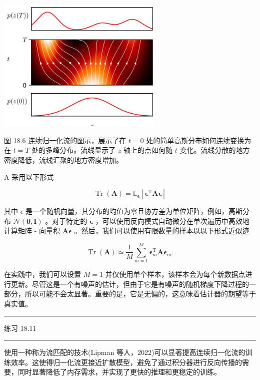 \documentclass[10pt]{report}
\newcommand{\HRule}{\begin{center}\rule{0.9\linewidth}{0.2mm}\end{center}}
\begin{document}
\begin{center}
\includegraphics[max width=0.6\textwidth]{images/0194e279-9b28-703a-88f4-c3ac21e2010d_577_786_342_770_622_0.jpg}
\end{center}
\hspace*{3em} 

图 18.6 连续归一化流的图示，展示了在 \(t = 0\) 处的简单高斯分布如何连续变换为在 \(t = T\) 处的多峰分布。流线显示了 \(z\) 轴上的点如何随 \(t\) 变化。流线分散的地方密度降低，流线汇聚的地方密度增加。

A 采用以下形式

\[
\operatorname{Tr}\left( \mathbf{A}\right)  = {\mathbb{E}}_{\mathbf{\epsilon }}\left\lbrack  {{\mathbf{\epsilon }}^{\mathrm{T}}\mathbf{A}\mathbf{\epsilon }}\right\rbrack   \tag{18.29}
\]

其中 \(\epsilon\) 是一个随机向量，其分布的均值为零且协方差为单位矩阵，例如，高斯分布 \(\mathcal{N}\left( {\mathbf{0},\mathbf{I}}\right)\) 。对于特定的 \(\mathbf{\epsilon }\) ，可以使用反向模式自动微分在单次遍历中高效地计算矩阵 - 向量积 \(\mathbf{A}\mathbf{\epsilon }\) 。然后，我们可以使用有限数量的样本以以下形式近似迹

\[
\operatorname{Tr}\left( \mathbf{A}\right)  \simeq  \frac{1}{M}\mathop{\sum }\limits_{{m = 1}}^{M}{\mathbf{\epsilon }}_{m}^{\mathrm{T}}\mathbf{A}{\mathbf{\epsilon }}_{m}. \tag{18.30}
\]

在实践中，我们可以设置 \(M = 1\) 并仅使用单个样本，该样本会为每个新数据点进行更新。尽管这是一个有噪声的估计，但由于它是有噪声的随机梯度下降过程的一部分，所以可能不会太显著。重要的是，它是无偏的，这意味着估计器的期望等于真实值。

\HRule

练习 18.11

\HRule

使用一种称为流匹配的技术(Lipman 等人，2022)可以显著提高连续归一化流的训练效率。这使得归一化流更接近扩散模型，避免了通过积分器进行反向传播的需要，同时显著降低了内存需求，并实现了更快的推理和更稳定的训练。
\end{document}
